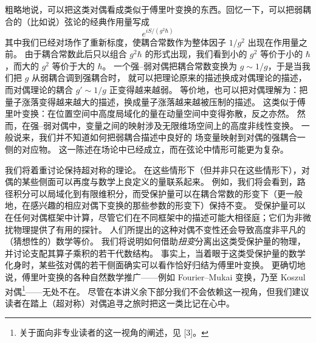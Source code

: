 粗略地说，可以把这类对偶看成类似于傅里叶变换的东西。回忆一下，可以把弱耦合的（比如说）弦论的经典作用量写成
\[
e^{iS/(g^2\hbar)}
\]
其中我们已经对场作了重新标度，使耦合常数作为整体因子 $1/g^2$ 出现在作用量之前。
由于耦合常数此后只以组合 $g^2\hbar$ 的形式出现，我们看到小的 $g^2$ 等价于小的 $\hbar$，而大的 $g^2$ 等价于大的 $\hbar$。
一个强–弱对偶把耦合常数变换为 $g\sim 1/g$，于是当我们把 $g$ 从弱耦合调到强耦合时，
就可以把理论原来的描述换成对偶理论的描述，而对偶理论的耦合 $g'\sim 1/g$ 正变得越来越弱。
等价地，也可以把对偶理解为：把量子涨落变得越来越大的描述，换成量子涨落越来越被压制的描述。
这类似于傅里叶变换：在位置空间中高度局域化的量在动量空间中变得弥散，反之亦然。
然而，在强–弱对偶中，变量之间的映射涉及无限维场空间上的高度非线性变换。
一般说来，我们并不知道如何把弱耦合描述中良好的%
场变量映射到对偶的强耦合一侧的对应物。
这一陈述在场论中已经成立，而在弦论中情形可能更为复杂。

我们将着重讨论保持超对称的理论。
在这些情形下（但并非只在这些情形下），对偶的某些侧面可以再度与数学上良定义的量联系起来。
例如，我们将会看到，路径积分可以局域化到有限维积分，而受保护量可以在耦合常数的形变下（更一般地，在感兴趣的相应对偶下变换的那些参数的形变下）保持不变。
受保护量可以在任何对偶框架中计算，尽管它们在不同框架中的描述可能大相径庭；它们为非微扰物理提供了有用的探针。
人们所提出的这种对偶不变性还会导致高度非平凡的（猜想性的）数学等价。
我们将说明如何借助\emph{扭变}分离出这类受保护量的物理，并讨论支配其算子乘积的若干代数结构。
事实上，当着眼于这类受保护量的数学化身时，某些弦对偶的若干侧面确实可以看作恰好归结为傅里叶变换。
更确切地说，傅里叶变换的各种自然数学推广——例如 Fourier--Mukai 变换，乃至 Koszul 对偶\footnote{关于面向非专业读者的这一视角的阐述，见 [3]。}——无处不在。
尽管在本讲义余下部分我们不会依赖这一视角，但我们建议读者在踏上（超对称）对偶追寻之旅时把这一类比记在心中。

